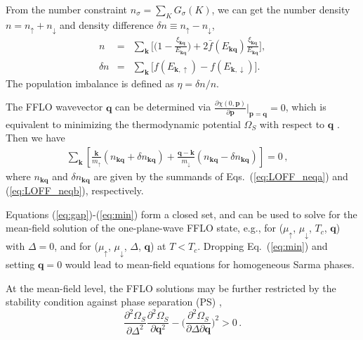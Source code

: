 \documentclass[aps,twocolumn,prl,tightenlines,floatfix]{revtex4-1}
\begin{document}
From the number constraint $n_{\sigma}=\sum_{K}G_{\sigma}(K)$, we can
get the number density $n=n_{\uparrow}+n_{\downarrow}$ and density
difference $\delta n\equiv n_{\uparrow}-n_{\downarrow}$,
\begin{eqnarray}
  n&=&\sum_{\textbf{k}}\Big[\Big(1-\frac{\xi_{\textbf{kq}}}{E_{\textbf{kq}}}\Big)+
  2\bar{f}(E_{\textbf{kq}})\frac{\xi_{\textbf{kq}}}{E_{\textbf{kq}}}\Big], 
  \label{eq:LOFF_neqa}\\
  \delta n&=&\sum_{\textbf{k}}
  \Big[f(E_{\textbf{k},\uparrow})-f(E_{\textbf{k},\downarrow})\Big].
  \label{eq:LOFF_neqb}
\end{eqnarray}
%
The population imbalance is defined as $\eta = \delta n/n$.

The FFLO wavevector $\mathbf{q}$ can be determined via $\frac{\partial
  \chi(0,\mathbf{p})}{\partial \mathbf{p}}|_\mathbf{p=q}=0$, which is
equivalent to minimizing the thermodynamic potential
$\Omega_{S}$ with respect to $\mathbf{q}$ \cite{FFLO_MF_us}. Then we have 
%
\begin{eqnarray}
\sum_{\mathbf{k}}\left[\frac{\mathbf{k}}
  {m_{\uparrow}}(n_{\textbf{kq}}+\delta n_{\textbf{kq}})+
  \frac{\mathbf{q-k}}{m_{\downarrow}}
  ( n_{\textbf{kq}}-\delta n_{\textbf{kq}})\right]=0\,,\quad
  \label{eq:min}
\end{eqnarray}
%
where $n_{\textbf{kq}}$ and $\delta n_{\textbf{kq}}$ are given by the
summands of Eqs.~(\ref{eq:LOFF_neqa}) and (\ref{eq:LOFF_neqb}),
respectively. 

Equations (\ref{eq:gap})-(\ref{eq:min}) form a closed set, and can be
used to solve for the mean-field solution of the one-plane-wave FFLO
state, e.g., for ($\mu_\uparrow$, $\mu_\downarrow$, $T_c$,
$\mathbf{q}$) with $\Delta=0$, and for ($\mu_\uparrow$,
$\mu_\downarrow$, $\Delta$, $\mathbf{q}$) at $T<T_c$.  Dropping
Eq.~(\ref{eq:min}) and setting $\mathbf{q}=0$ would lead to mean-field
equations for homogeneous Sarma phases.

At the mean-field level, the FFLO solutions may be further restricted
by the stability condition against phase separation (PS)
\cite{PWY05,Stability,LOFF1},
\begin{equation}
  \frac{\partial^{2}\Omega_{S}}{\partial\Delta^{2}}
  \frac{\partial^{2}\Omega_{S}}{\partial\textbf{q}^{2}}-
  \Big(\frac{\partial^{2}\Omega_{S}}
  {\partial\Delta\partial\textbf{q}}\Big)^{2}>0\,.
\label{eq:sta}
\end{equation}
\end{document}
